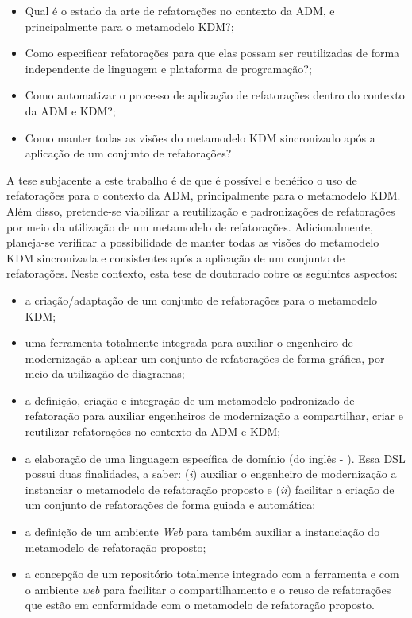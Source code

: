 \begin{itemize}
 	\item Qual é o estado da arte de refatorações no contexto da ADM, e principalmente para o metamodelo KDM?;
 	\item Como especificar refatorações para que elas possam ser reutilizadas de forma independente de linguagem e plataforma de programação?;
 	\item Como automatizar o processo de aplicação de refatorações dentro do contexto da ADM e KDM?;
 	\item Como manter todas as visões do metamodelo KDM sincronizado após a aplicação de um conjunto de refatorações?
 \end{itemize} 


A tese subjacente a este trabalho é de que é possível e benéfico o uso de refatorações para o contexto da ADM, principalmente para o metamodelo KDM. Além disso, pretende-se viabilizar a reutilização e padronizações de refatorações por meio da utilização de um metamodelo de refatorações. Adicionalmente, planeja-se verificar a possibilidade de manter todas as visões do metamodelo KDM sincronizada e consistentes após a aplicação de um conjunto de refatorações. %
Neste contexto, esta tese de doutorado cobre os seguintes aspectos: 


\begin{itemize}
	\item a criação/adaptação de um conjunto de refatorações para o metamodelo KDM;
	\item uma ferramenta totalmente integrada para auxiliar o engenheiro de modernização a aplicar um conjunto de refatorações de forma gráfica, por meio da utilização de diagramas;
	\item a definição, criação e integração de um metamodelo padronizado de refatoração para auxiliar engenheiros de modernização a compartilhar, criar e reutilizar refatorações no contexto da ADM e KDM;
	\item a elaboração de uma linguagem específica de domínio (do inglês - ). Essa DSL possui duas finalidades, a saber: (\textit{i}) auxiliar o engenheiro de modernização a instanciar o metamodelo de refatoração proposto e (\textit{ii}) facilitar a criação de um conjunto de refatorações de forma guiada e automática;
	\item a definição de um ambiente \emph{Web} para também auxiliar a instanciação do metamodelo de refatoração proposto;
	\item a concepção de um repositório totalmente integrado com a ferramenta e com o ambiente \emph{web} para facilitar o compartilhamento e o reuso de refatorações que estão em conformidade com o metamodelo de refatoração proposto.
\end{itemize}


